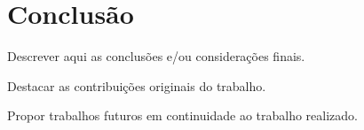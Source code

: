 \chapter[Conclusão]{Conclusão}

Descrever aqui as conclusões e/ou considerações finais.

Destacar as contribuições originais do trabalho.

Propor trabalhos futuros em continuidade ao trabalho realizado.